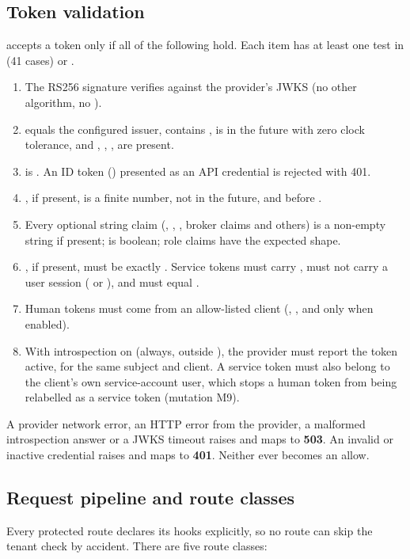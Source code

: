\subsection{Token validation}
 accepts a token only if all of the following hold. Each item has at least one test in  (41 cases) or .
\begin{enumerate}
  \item The RS256 signature verifies against the provider's JWKS (no other algorithm, no ).
  \item {} equals the configured issuer,  contains ,  is in the future with zero clock tolerance, and , , ,  are present.
  \item {} is . An ID token () presented as an API credential is rejected with 401.
  \item {}, if present, is a finite number, not in the future, and before .
  \item Every optional string claim (, , , broker claims and others) is a non-empty string if present;  is boolean; role claims have the expected shape.
  \item {}, if present, must be exactly . Service tokens must carry , must not carry a user session ( or ), and  must equal .
  \item Human tokens must come from an allow-listed client (, , and  only when enabled).
  \item With introspection on (always, outside ), the provider must report the token active, for the same subject and client. A service token must also belong to the client's own service-account user, which stops a human token from being relabelled as a service token (mutation M9).
\end{enumerate}
A provider network error, an HTTP error from the provider, a malformed introspection answer or a JWKS timeout raises  and maps to \textbf{503}. An invalid or inactive credential raises  and maps to \textbf{401}. Neither ever becomes an allow.

\subsection{Request pipeline and route classes}
Every protected route declares its hooks explicitly, so no route can skip the tenant check by accident. There are five route classes:


